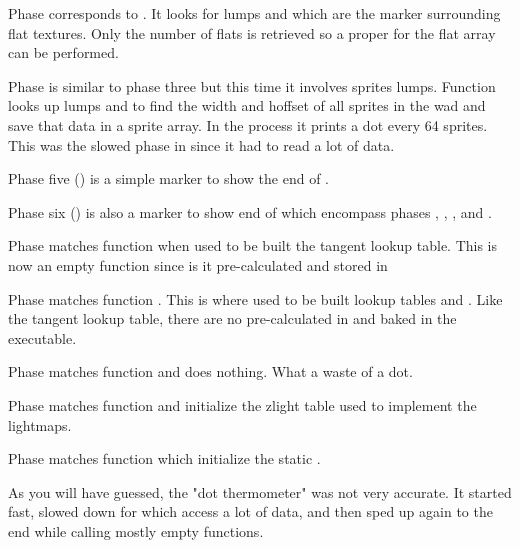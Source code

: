 Phase  corresponds to . It looks for lumps  and  which are the marker surrounding flat textures. Only the number of flats is retrieved so a proper  for the flat array can be performed.\\
\par

Phase  is similar to phase three but this time it involves sprites lumps. Function  looks up lumps  and  to find the width and hoffset of all sprites in the wad  and save that data in a sprite array. In the process it prints a dot every 64 sprites. This was the slowed phase in  since it had to read a lot of data.\\
\par

Phase five () is a simple marker to show the end of .\\
\par

Phase six () is also a marker to show end of  which encompass phases , , , and .\\
\par

Phase  matches function  when used to be built the tangent lookup table. This is now an empty function since is it pre-calculated and stored in \\
\par

Phase  matches function . This is where used to be built lookup tables  and . Like the tangent lookup table, there are no pre-calculated in  and baked in the executable.\\
\par

Phase  matches function  and does nothing. What a waste of a dot.\\
\par

Phase  matches function  and initialize the zlight table used to implement the lightmaps.\\
\par

Phase  matches function  which initialize the static .\\
\par
As you will have guessed, the "dot thermometer" was not very accurate. It started fast, slowed down for  which access a lot of data, and then sped up again to the end while calling mostly empty functions.\\
\par
